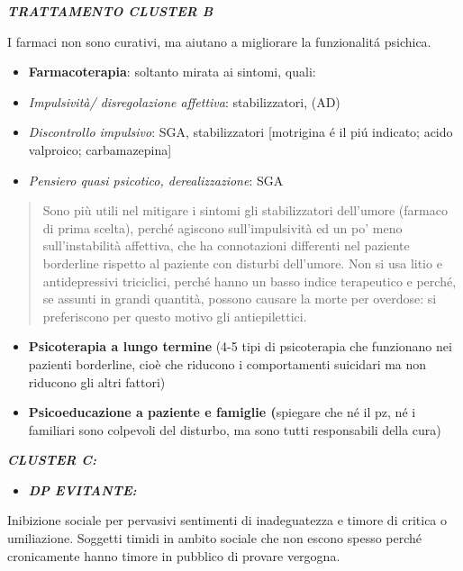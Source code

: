 \documentclass[]{article}
\begin{document}
\textbf{\emph{TRATTAMENTO CLUSTER B}}

I farmaci non sono curativi, ma aiutano a migliorare la funzionalitá
psichica.

\begin{itemize}
\item
  \textbf{Farmacoterapia}: soltanto mirata ai sintomi, quali:
\end{itemize}

\begin{itemize}
\item
  \emph{Impulsività/ disregolazione affettiva}: stabilizzatori, (AD)
\item
  \emph{Discontrollo impulsivo}: SGA, stabilizzatori {[}motrigina é il
  piú indicato; acido valproico; carbamazepina{]}
\item
  \emph{Pensiero quasi psicotico, derealizzazione}: SGA
\end{itemize}

\begin{quote}
Sono più utili nel mitigare i sintomi gli stabilizzatori dell'umore
(farmaco di prima scelta), perché agiscono sull'impulsività ed un po'
meno sull'instabilità affettiva, che ha connotazioni differenti nel
paziente borderline rispetto al paziente con disturbi dell'umore. Non si
usa litio e antidepressivi triciclici, perché hanno un basso indice
terapeutico e perché, se assunti in grandi quantità, possono causare la
morte per overdose: si preferiscono per questo motivo gli
antiepilettici.
\end{quote}

\begin{itemize}
\item
  \textbf{Psicoterapia a lungo termine} (4-5 tipi di psicoterapia che
  funzionano nei pazienti borderline, cioè che riducono i comportamenti
  suicidari ma non riducono gli altri fattori)
\item
  \textbf{Psicoeducazione a paziente e famiglie (}spiegare che né il pz,
  né i familiari sono colpevoli del disturbo, ma sono tutti responsabili
  della cura)
\end{itemize}

\textbf{\emph{CLUSTER C:}}

\begin{itemize}
\item
  \textbf{\emph{DP EVITANTE:}}
\end{itemize}

Inibizione sociale per pervasivi sentimenti di inadeguatezza e timore di
critica o umiliazione. Soggetti timidi in ambito sociale che non escono
spesso perché cronicamente hanno timore in pubblico di provare vergogna.
\end{document}

